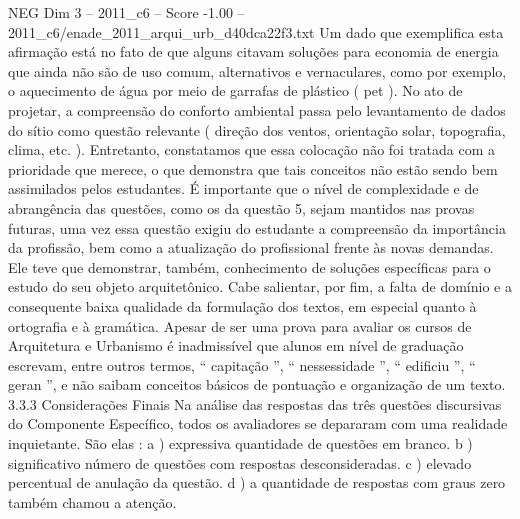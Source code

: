 \begin{textsample}{NEG Dim 3 – 2011\_c6 – Score -1.00 – 2011\_c6/enade\_2011\_arqui\_urb\_d40dca22f3.txt}
Um dado que exemplifica esta afirmação está no fato de que alguns citavam soluções para economia de energia que ainda não são de uso comum, alternativos e vernaculares, como por exemplo, o aquecimento de água por meio de garrafas de plástico ( pet ).
No ato de projetar, a compreensão do conforto ambiental passa pelo levantamento de dados do sítio como questão relevante ( direção dos ventos, orientação solar, topografia, clima, etc. ).
Entretanto, constatamos que essa colocação não foi tratada com a prioridade que merece, o que demonstra que tais conceitos não estão sendo bem assimilados pelos estudantes.
É importante que o nível de complexidade e de abrangência das questões, como os da questão 5, sejam mantidos nas provas futuras, uma vez essa questão exigiu do estudante a compreensão da importância da profissão, bem como a atualização do profissional frente às novas demandas.
Ele teve que demonstrar, também, conhecimento de soluções específicas para o estudo do seu objeto arquitetônico.
Cabe salientar, por fim, a falta de domínio e a consequente baixa qualidade da formulação dos textos, em especial quanto à ortografia e à gramática.
Apesar de ser uma prova para avaliar os cursos de Arquitetura e Urbanismo é inadmissível que alunos em nível de graduação escrevam, entre outros termos, “ capitação ”, “ nessessidade ”, “ edificiu ”, “ geran ”, e não saibam conceitos básicos de pontuação e organização de um texto. 3.3.3 Considerações Finais Na análise das respostas das três questões discursivas do Componente Específico, todos os avaliadores se depararam com uma realidade inquietante.
São elas : a ) expressiva quantidade de questões em branco. b ) significativo número de questões com respostas desconsideradas. c ) elevado percentual de anulação da questão. d ) a quantidade de respostas com graus zero também chamou a atenção.

\end{textsample}
